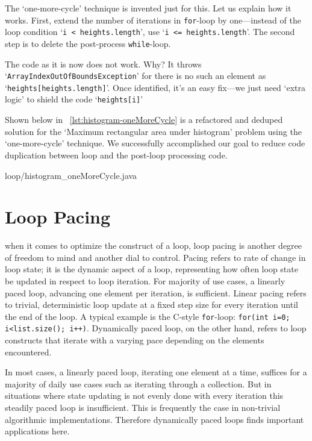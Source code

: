 \documentclass[oneside,11pt]{book}
\theoremstyle{definition}
\theoremstyle{remark}
\newcommand{\code}[1]{\mbox{\lstinline{#1}}}
\begin{document}
The `one-more-cycle' technique is invented just for this.
Let us explain how it works.
First, extend the number of iterations in \code{for}-loop by one---instead of the loop
condition `\code{i < heights.length}', use `\code{i <= heights.length}'.
The second step is to delete the post-process \code{while}-loop.


The code as it is now does not work.
Why?
It throws `\code{ArrayIndexOutOfBoundsException}' for there is no such an element as
`\code{heights[heights.length]}'.
Once identified, it's an easy fix---we just need `extra logic' to shield
the code `\code{heights[i]}'


Shown below in ~\autoref{lst:histogram-oneMoreCycle} is
a refactored and deduped solution for the `Maximum rectangular area under
histogram' problem using the `one-more-cycle' technique.
We successfully accomplished our goal to
reduce code duplication between loop and the post-loop processing code.

{loop/histogram_oneMoreCycle.java}


\section{Loop Pacing}\label{sec:loop-pacing}

when it comes to optimize the construct of a loop, loop pacing is another degree of
freedom to mind and another dial to control.
Pacing refers to rate of change in loop state;
it is the dynamic aspect of a loop, representing how often loop state be updated in
respect to loop iteration.
For majority of use cases, a linearly paced loop, advancing one element per iteration, is
sufficient.
Linear pacing refers to trivial, deterministic loop update at a fixed step size for every
iteration until the end of the loop.
A typical example is the C-style \code{for}-loop: \code{for(int i=0; i<list.size(); i++)}.
Dynamically paced loop, on the other hand, refers to loop constructs that iterate
with a varying pace depending on the elements encountered.


In most cases, a linearly paced loop, iterating one element at a time, suffices
for a majority of daily use cases such as iterating through a collection.
But in situations where state updating is not evenly done with every iteration this steadily
paced loop is insufficient.
This is frequently the case in non-trivial algorithmic implementations.
Therefore dynamically paced loops finds important applications here.
\end{document}
